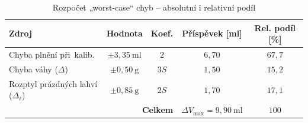 

\begin{table}[h]
\centering
\caption{Rozpočet „worst-case“ chyb – absolutní i relativní podíl}
\renewcommand{\arraystretch}{1.15}
\begin{tabular}{@{}lcccc@{}}
\toprule
\textbf{Zdroj} & \textbf{Hodnota} & \textbf{Koef.} & \textbf{Příspěvek [ml]} & \textbf{Rel. podíl [\%]}\\
\midrule
Chyba plnění při~kalib.        & $\pm3{,}35\ \mathrm{ml}$ & $2$ & $6{,}70$ & $67{,}7$\\
Chyba váhy (\(\Delta\))        & $\pm0{,}50\ \mathrm{g}$ & $3S$ & $1{,}50$ & $15{,}2$\\
Rozptyl prázdných lahví (\(\Delta_\ell\))
                               & $\pm0{,}85\ \mathrm{g}$ & $2S$ & $1{,}70$ & $17{,}1$\\
\midrule
\multicolumn{3}{r}{\textbf{Celkem}} &
\(\boxed{\Delta V_{\text{max}} = 9{,}90\ \mathrm{ml}}\) & $100$\\
\bottomrule
\end{tabular}
\label{tab:worst_case_budget_rel}
\end{table}


